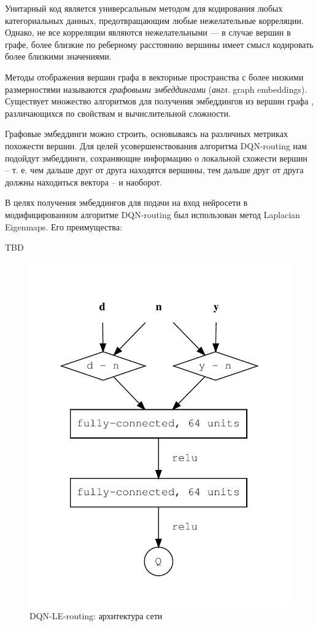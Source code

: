 \documentclass[specification,annotation,times]{itmo-student-thesis}
\theoremstyle{definition}
\begin{document}
Унитарный код является универсальным методом для кодирования любых
категориальных данных, предотвращающим любые нежелательные корреляции. Однако,
не все корреляции являются нежелательными --- в случае вершин в графе, более близкие
по реберному расстоянию вершины имеет смысл кодировать более близкими
значениями.

Методы отображения вершин графа в векторные пространства с более низкими
размерностями называются \textit{графовыми эмбеддингами} (\textit{англ.} graph
embeddings). Существует множество алгоритмов для получения эмбеддингов из вершин
графа \cite{cai2018comprehensive, goyal2018graph}, различающихся по свойствам и
вычислительной сложности. 

Графовые эмбеддинги можно строить, основываясь на различных метриках похожести
вершин. Для целей усовершенствования алгоритма DQN-routing нам подойдут эмбеддинги,
сохраняющие информацию о локальной схожести вершин -- т. е. чем дальше друг от
друга находятся вершины, тем дальше друг от друга должны находиться вектора -- и
наоборот.

В целях получения эмбеддингов для подачи на вход нейросети в модифицированном
алгоритме DQN-routing был использован метод Laplacian Eigenmaps. Его
преимущества:

TBD
\begin{figure}[!h]
  \caption{DQN-LE-routing: архитектура сети}\label{nn-1-one-out}
  \centering
  \includegraphics[scale=1]{nn-1-one-out}
\end{figure}
\end{document}
